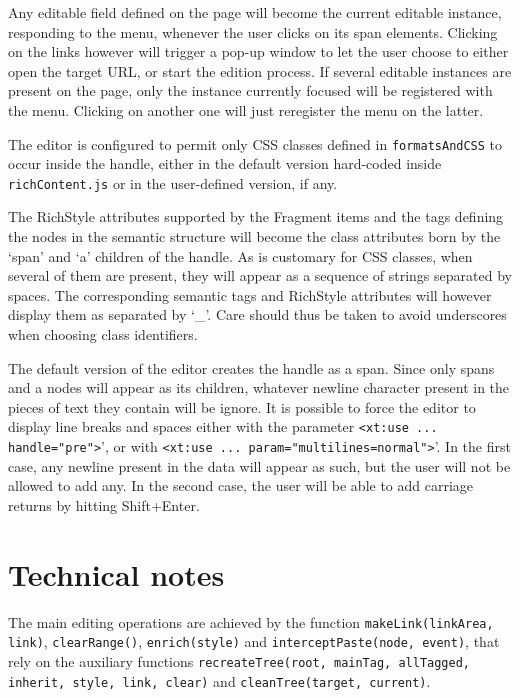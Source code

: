 \documentclass[11pt,a4paper]{article}
\begin{document}
Any editable field defined on the page will become the current editable instance, responding to the menu, whenever the user clicks on its span elements. Clicking on the links however will trigger a pop-up window to let the user choose to either open the target URL, or start the edition process. If several editable instances are present on the page, only the instance currently focused will be registered with the menu. Clicking on another one will just reregister the menu on the latter.


The editor is configured to permit only CSS classes defined in \texttt{formatsAndCSS} to occur inside the handle, either in the default version hard-coded inside \texttt{richContent.js} or in the user-defined version, if any.
 

The RichStyle attributes supported by the Fragment items and the tags defining the nodes in the semantic structure will become the class attributes born by the `span' and `a' children of the handle. As is customary for CSS classes, when several of them are present, they will appear as a sequence of strings separated by spaces. The corresponding semantic tags and RichStyle attributes will however display them as separated by `\_'. Care should thus be taken to avoid underscores when choosing class identifiers. 


The default version of the editor creates the handle as a span. Since only spans and a nodes will appear as its children, whatever newline character present in the pieces of text they contain will be ignore. It is possible to force the editor to display line breaks and spaces either with the parameter \verb?<xt:use ... handle="pre">?', or with \verb?<xt:use ... param="multilines=normal">?'. In the first case, any newline present in the data will appear as such, but the user will not be allowed to add any. In the second case, the user will be able to add carriage returns by hitting Shift+Enter.  

\section{Technical notes}

The main editing operations are achieved by the function \texttt{makeLink(linkArea, link)}, \texttt{clearRange()}, \texttt{enrich(style)} and \texttt{interceptPaste(node, event)}, that rely on the auxiliary functions \texttt{recreateTree(root, mainTag, allTagged, inherit, style, link, clear)} and \texttt{cleanTree(target, current)}. 
\end{document}
